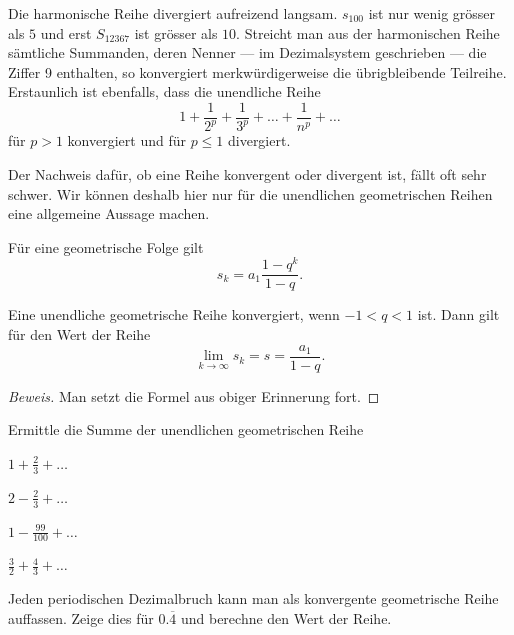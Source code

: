\documentclass[%
11pt,%
twoside,%
titlepage,%
german,%
headsepline%
]{scrartcl}
\begin{document}
Die harmonische Reihe divergiert aufreizend langsam. $s_{100}$ ist nur wenig gr\"osser als $5$ und erst $S_{12367}$ ist gr\"osser als $10$. Streicht man aus der harmonischen Reihe s\"amtliche Summanden, deren Nenner --- im Dezimalsystem geschrieben --- die Ziffer 9 enthalten, so konvergiert merkw\"urdigerweise die \"ubrigbleibende Teilreihe. Erstaunlich ist ebenfalls, dass die unendliche Reihe
$$1+\frac{1}{2^p}+\frac{1}{3^p}+\dots+\frac{1}{n^p}+\dots$$
f\"ur $p>1$ konvergiert und f\"ur $p\leq1$ divergiert.

Der Nachweis daf\"ur, ob eine Reihe konvergent oder divergent ist, fällt oft sehr schwer. Wir k\"onnen deshalb hier nur f\"ur die unendlichen geometrischen Reihen eine allgemeine Aussage machen.

\begin{erin}
F\"ur eine geometrische Folge gilt
$$s_k=a_1\frac{1-q^k}{1-q}.$$
\end{erin}

\begin{csatz}{}
Eine unendliche geometrische Reihe konvergiert, wenn $-1<q<1$ ist. Dann gilt f\"ur den Wert der Reihe
$$\lim_{k\to\infty}s_k=s=\frac{a_1}{1-q}.$$
\end{csatz}
\begin{proof}[Beweis]
Man setzt die Formel aus obiger Erinnerung fort.
\end{proof}

\begin{ueb}[Reihen]
Ermittle die Summe der unendlichen geometrischen Reihe

\begin{minipage}{0.23\textwidth}
\begin{enumeratea}
\item $1+\frac{2}{3}+\dots$
\item $2-\frac{2}{3}+\dots$
\end{enumeratea}
\end{minipage}
\begin{minipage}{0.23\textwidth}
\begin{enumeratea}
\addtocounter{enumi}{2}
\item $1-\frac{99}{100}+\dots$
\item $\frac{3}{2}+\frac{4}{3}+\dots$
\end{enumeratea}
\end{minipage}
\end{ueb}

\begin{ueb}[Quartastoff]
Jeden periodischen Dezimalbruch kann man als konvergente geometrische Reihe auffassen. Zeige dies f\"ur $0.\overline{4}$ und berechne den Wert der Reihe.
\end{ueb}
\end{document}
